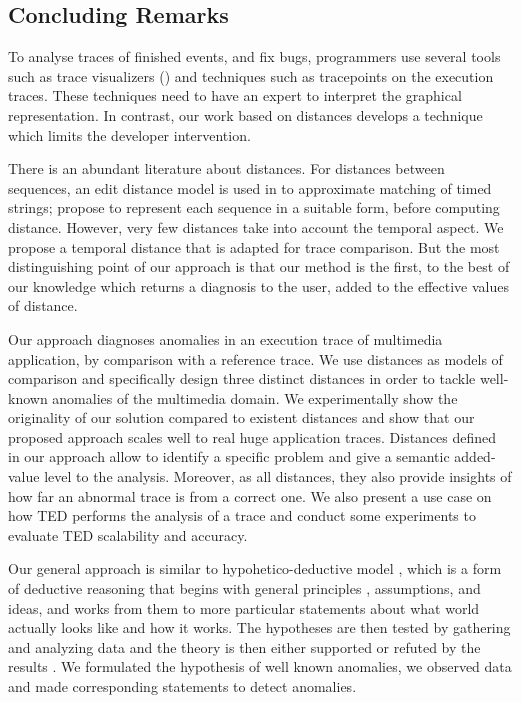 \subsection{Concluding Remarks}
To analyse traces of finished events, and fix bugs, programmers use several tools such as trace visualizers (\cite{paje,tracevis,vet,surv08})
 and techniques such as tracepoints on the execution traces. These techniques need to have an expert to 
interpret the graphical representation. In contrast, our work based on distances develops a technique which limits the developer intervention.

There is an abundant literature about distances. For distances between sequences, an edit distance model is used in \cite{do09} 
to approximate matching of timed strings; \cite{kos11, gu12} propose to represent each sequence in a suitable form, before computing distance. 
However, very few distances take into account the temporal aspect. We propose a temporal distance that is adapted for trace comparison. But the 
most distinguishing point of our approach is that our method is the first, to the best of our knowledge which returns a diagnosis to the user, 
added to the effective values of distance.

Our approach diagnoses anomalies in an execution trace of multimedia application, by comparison with a reference trace. We use distances as models 
of comparison and specifically design three distinct distances in order to tackle well-known anomalies of the multimedia domain. We experimentally 
show the originality of our solution compared to existent distances and show that our proposed approach scales well to real huge application traces. 
Distances defined in our approach allow to identify a specific problem and give a semantic added-value level to the analysis. Moreover, as all 
distances, they also provide insights of how far an abnormal trace is from a correct one. We also present a use case on how TED performs the 
analysis of a trace and conduct some experiments to evaluate TED scalability and accuracy. 

Our general approach is similar to hypohetico-deductive model \cite{hypodeduc1}, which is a form of deductive reasoning that begins with general principles
, assumptions, and ideas, and works from them to more particular statements about what world actually looks like and how it works. The hypotheses are then tested by gathering and analyzing 
data and the theory is then either supported or refuted by the results \cite{hypodeduc2}. We formulated the hypothesis of well known anomalies, we observed data 
and made corresponding statements to detect anomalies.

